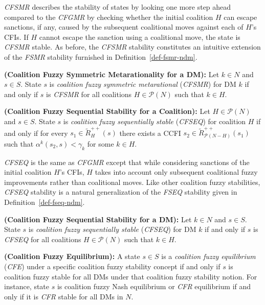 \emph{CFSMR} describes the stability of states by looking one more step ahead compared to the \emph{CFGMR} by checking whether the initial coalition $H$ can escape sanctions, if any, caused by the subsequent coalitional moves against each of $H$'s CFIs. If $H$ cannot escape the sanction using a coalitional move, the state is \emph{CFSMR} stable. As before, the \emph{CFSMR} stability constitutes an intuitive extension of the \emph{FSMR} stability furnished in Definition~\ref{def-fsmr-ndm}.

\begin{definition}\label{def-cfsmr-dm}
\rm {\bf (Coalition Fuzzy Symmetric Metarationality for a DM):} Let $k \in N$ and $s \in S$. State $s$ is \emph{coalition fuzzy symmetric metarational} (\emph{CFSMR}) for DM $k$ if and only if $s$ is \emph{CFSMR} for all coalitions $H \in \mathcal{P}(N)$ such that $k \in H$.
\end{definition}

\begin{definition}\label{def-cfseq-coal}
\rm {\bf (Coalition Fuzzy Sequential Stability for a Coalition):}
Let $H \in \mathcal{P}(N)$ and $s \in S$. State $s$ is \emph{coalition fuzzy sequentially stable} (\emph{CFSEQ}) for coalition $H$ if and only if for every $s_1 \in \widetilde{R}_H^{++}(s)$ there exists a CCFI $s_2 \in \widetilde{R}_{\mathcal{P}(N-H)}^{++}(s_1)$ such that $\alpha^k(s_2, s)<\gamma_k$ for some $k \in H$.
\end{definition}

\emph{CFSEQ} is the same as \emph{CFGMR} except that while considering sanctions of the initial coalition $H$'s CFIs, $H$ takes into account only subsequent coalitional fuzzy improvements rather than coalitional moves. Like other coalition fuzzy stabilities, \emph{CFSEQ} stability is a natural generalization of the \emph{FSEQ} stability given in Definition~\ref{def-fseq-ndm}.

\begin{definition}\label{def-cfseq-dm}
\rm {\bf (Coalition Fuzzy Sequential Stability for a DM):}
Let $k \in N$ and $s \in S$. State $s$ is \emph{coalition fuzzy sequentially stable} (\emph{CFSEQ}) for DM $k$ if and only if $s$ is \emph{CFSEQ} for all coalitions $H \in \mathcal{P}(N)$ such that $k \in H$.
\end{definition}

\begin{definition}\label{def-cfe}
\rm {\bf (Coalition Fuzzy Equilibrium):} A state $s \in S$ is a \emph{coalition fuzzy equilibrium} (\emph{CFE}) under a specific coalition fuzzy stability concept if and only if $s$ is coalition fuzzy stable for all DMs under that coalition fuzzy stability notion. For instance, state $s$ is coalition fuzzy Nash equilibrium or \emph{CFR} equilibrium if and only if it is \emph{CFR} stable for all DMs in $N$.
\end{definition}

